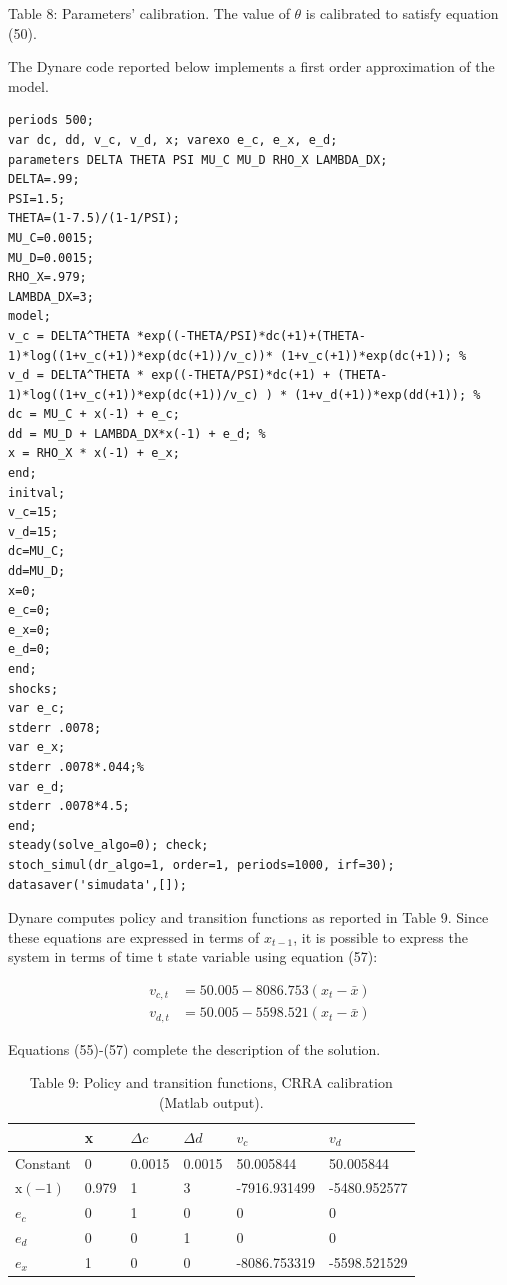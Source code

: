 \documentclass[10pt]{article}
\begin{document}
Table 8: Parameters' calibration. The value of $\theta$ is calibrated to satisfy equation (50).

The Dynare code reported below implements a first order approximation of the model.

\begin{verbatim}
periods 500;
var dc, dd, v_c, v_d, x; varexo e_c, e_x, e_d;
parameters DELTA THETA PSI MU_C MU_D RHO_X LAMBDA_DX;
DELTA=.99;
PSI=1.5;
THETA=(1-7.5)/(1-1/PSI);
MU_C=0.0015;
MU_D=0.0015;
RHO_X=.979;
LAMBDA_DX=3;
model;
v_c = DELTA^THETA *exp((-THETA/PSI)*dc(+1)+(THETA-1)*log((1+v_c(+1))*exp(dc(+1))/v_c))* (1+v_c(+1))*exp(dc(+1)); %
v_d = DELTA^THETA * exp((-THETA/PSI)*dc(+1) + (THETA-1)*log((1+v_c(+1))*exp(dc(+1))/v_c) ) * (1+v_d(+1))*exp(dd(+1)); %
dc = MU_C + x(-1) + e_c;
dd = MU_D + LAMBDA_DX*x(-1) + e_d; %
x = RHO_X * x(-1) + e_x;
end;
initval;
v_c=15;
v_d=15;
dc=MU_C;
dd=MU_D;
x=0;
e_c=0;
e_x=0;
e_d=0;
end;
shocks;
var e_c;
stderr .0078;
var e_x;
stderr .0078*.044;%
var e_d;
stderr .0078*4.5;
end;
steady(solve_algo=0); check;
stoch_simul(dr_algo=1, order=1, periods=1000, irf=30);
datasaver('simudata',[]);
\end{verbatim}

Dynare computes policy and transition functions as reported in Table 9. Since these equations are expressed in terms of $x_{t-1}$, it is possible to express the system in terms of time t state variable using equation (57):

$$
\begin{aligned}
v_{c, t} & =50.005-8086.753\left(x_{t}-\bar{x}\right) \\
v_{d, t} & =50.005-5598.521\left(x_{t}-\bar{x}\right)
\end{aligned}
$$

Equations (55)-(57) complete the description of the solution.

\begin{table}[h]
\begin{center}
\begin{tabular}{|l|l|l|l|l|l|}
\hline
 & x & $\Delta c$ & $\Delta d$ & $v_{c}$ & $v_{d}$ \\
\hline
Constant & 0 & 0.0015 & 0.0015 & 50.005844 & 50.005844 \\
\hline
$\mathrm{x}(-1)$ & 0.979 & 1 & 3 & -7916.931499 & -5480.952577 \\
\hline
$e_{c}$ & 0 & 1 & 0 & 0 & 0 \\
\hline
$e_{d}$ & 0 & 0 & 1 & 0 & 0 \\
\hline
$e_{x}$ & 1 & 0 & 0 & -8086.753319 & -5598.521529 \\
\hline
\end{tabular}
\captionsetup{labelformat=empty}
\caption{Table 9: Policy and transition functions, CRRA calibration (Matlab output).}
\end{center}
\end{table}
\end{document}
